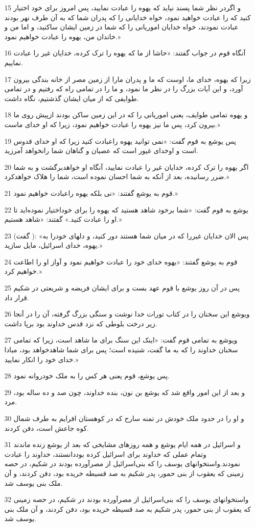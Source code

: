 \par 15 و اگردر نظر شما پسند نیاید که یهوه را عبادت نمایید، پس امروز برای خود اختیار کنید که را عبادت خواهید نمود، خواه خدایانی را که پدران شما که به آن طرف نهر بودند عبادت نمودند، خواه خدایان اموریانی را که شما در زمین ایشان ساکنید، و اما من و خاندان من، یهوه را عبادت خواهیم نمود.» 
\par 16 آنگاه قوم در جواب گفتند: «حاشا از ما که یهوه را ترک کرده، خدایان غیر را عبادت نماییم.
\par 17 زیرا که یهوه، خدای ما، اوست که ما و پدران مارا از زمین مصر از خانه بندگی بیرون آورد، و این آیات بزرگ را در نظر ما نمود، و ما را در تمامی راه که رفتیم و در تمامی طوایفی که از میان ایشان گذشتیم، نگاه داشت.
\par 18 و یهوه تمامی طوایف، یعنی اموریانی را که در این زمین ساکن بودند ازپیش روی ما بیرون کرد، پس ما نیز یهوه را عبادت خواهیم نمود، زیرا که او خدای ماست.»
\par 19 پس یوشع به قوم گفت: «نمی توانید یهوه راعبادت کنید زیرا که او خدای قدوس است و اوخدای غیور است که عصیان و گناهان شما رانخواهد آمرزید.
\par 20 اگر یهوه را ترک کرده، خدایان غیر را عبادت نمایید، آنگاه او خواهدبرگشت و به شما ضرر رسانیده، بعد از آنکه به شما احسان نموده است، شما را هلاک خواهدکرد.»
\par 21 قوم به یوشع گفتند: «نی بلکه یهوه راعبادت خواهیم نمود.»
\par 22 یوشع به قوم گفت: «شما برخود شاهد هستید که یهوه را برای خوداختیار نموده‌اید تا او را عبادت کنید.» گفتند: «شاهد هستیم.»
\par 23 (گفت ): «پس الان خدایان غیررا که در میان شما هستند دور کنید، و دلهای خودرا به یهوه، خدای اسرائیل، مایل سازید.»
\par 24 قوم به یوشع گفتند: «یهوه خدای خود را عبادت خواهیم نمود و آواز او را اطاعت خواهیم کرد.»
\par 25 پس در آن روز یوشع با قوم عهد بست و برای ایشان فریضه و شریعتی در شکیم قرار داد.
\par 26 ویوشع این سخنان را در کتاب تورات خدا نوشت و سنگی بزرگ گرفته، آن را در آنجا زیر درخت بلوطی که نزد قدس خداوند بود برپا داشت.
\par 27 ویوشع به تمامی قوم گفت: «اینک این سنگ برای ما شاهد است، زیرا که تمامی سخنان خداوند را که به ما گفت، شنیده است؛ پس برای شما شاهدخواهد بود، مبادا خدای خود را انکار نمایید.»
\par 28 پس یوشع، قوم یعنی هر کس را به ملک خودروانه نمود.
\par 29 و بعد از این امور واقع شد که یوشع بن نون، بنده خداوند، چون صد و ده ساله بود، مرد.
\par 30 و او را در حدود ملک خودش در تمنه سارح که در کوهستان افرایم به طرف شمال کوه جاعش است، دفن کردند.
\par 31 و اسرائیل در همه ایام یوشع و همه روزهای مشایخی که بعد از یوشع زنده ماندند وتمام عملی که خداوند برای اسرائیل کرده بوددانستند، خداوند را عبادت نمودند.واستخوانهای یوسف را که بنی‌اسرائیل از مصرآورده بودند در شکیم، در حصه زمینی که یعقوب از بنی حمور، پدر شکیم به صد قسیطه خریده بود، دفن کردند، و آن ملک بنی یوسف شد.
\par 32 واستخوانهای یوسف را که بنی‌اسرائیل از مصرآورده بودند در شکیم، در حصه زمینی که یعقوب از بنی حمور، پدر شکیم به صد قسیطه خریده بود، دفن کردند، و آن ملک بنی یوسف شد.


